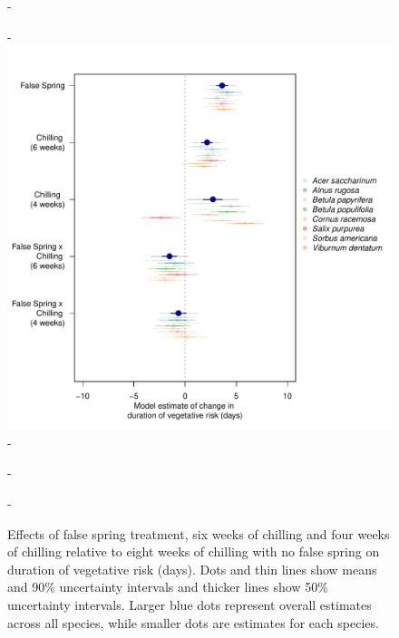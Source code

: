 \documentclass{article}\usepackage[]{graphicx}\usepackage[]{color}
\begin{document}
  {\begin{figure} [H]
  -\begin{center}
  -\includegraphics[width=18cm]{..//analyses/figures/dvr50and90_brms.pdf} 
  -\caption{Effects of false spring treatment, six weeks of chilling and four weeks of chilling relative to eight weeks of chilling with no false spring on duration of vegetative risk (days). Dots and thin lines show means and 90\% uncertainty intervals and thicker lines show 50\% uncertainty intervals. Larger blue dots represent overall estimates across all species, while smaller dots are estimates for each species. }\label{fig:muphen} 
  -\end{center}
  -\end{figure}}
  
\end{document}

